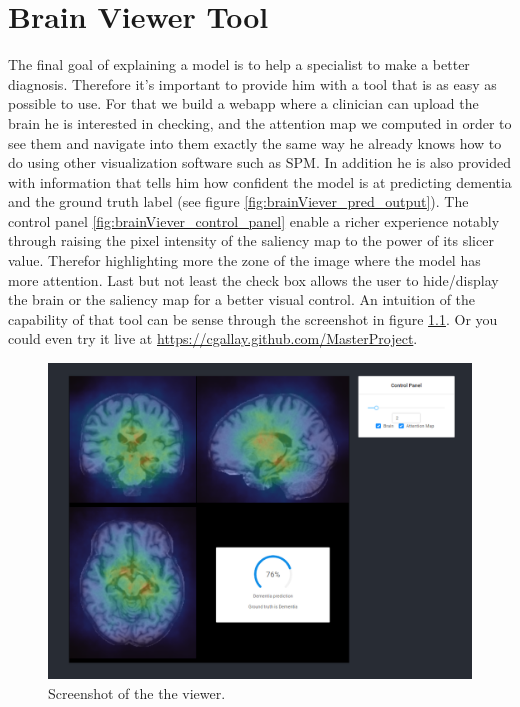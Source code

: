 \chapter{Brain Viewer Tool}
\label{chap:brainviewer}
The final goal of explaining a model is to help a specialist to make a better diagnosis. Therefore it's important to provide him with a tool that is as easy as possible to use. For that we build a webapp where a clinician can upload the brain he is interested in checking, and the attention map we computed in order to see them and navigate into them exactly the same way he already knows how to do using other visualization software such as SPM\footnotemark{}. In addition he is also provided with information that tells him how confident the model is at predicting dementia and the ground truth label (see figure \ref{fig:brainViever_pred_output}). The control panel \ref{fig:brainViever_control_panel} enable a richer experience notably through raising the pixel intensity of the saliency map to the power of its slicer value. Therefor highlighting more the zone of the image where the model has more attention. Last but not least the check box allows the user to hide/display the brain or the saliency map for a better visual control. An intuition of the capability of that tool can be sense through the screenshot in figure \ref{fig:brain_viewer}. Or you could even try it live at \href{https://cgallay.github.com/MasterProject}{https://cgallay.github.com/MasterProject}.

\begin{figure}
 \centering
 \includegraphics[width=.9\linewidth]{figures/BrainViewer/main.png}
 \captionsetup{width=.9\linewidth}
 \caption{Screenshot of the the viewer.}
 \label{fig:brain_viewer}
\end{figure}

